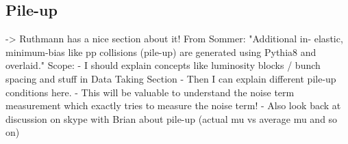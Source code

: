 



\subsection{Pile-up}


->  Ruthmann has a nice section about it!
From Sommer: "Additional in- elastic, minimum-bias like pp collisions (pile-up) are generated using Pythia8 and overlaid."
Scope:
- I should explain concepts like luminosity blocks  / bunch spacing and stuff in Data Taking Section
- Then I can explain different pile-up conditions here.
- This will be valuable to understand the noise term measurement which exactly tries to measure the noise term!
- Also look back at discussion on skype with Brian about pile-up (actual mu vs average mu and so on)
